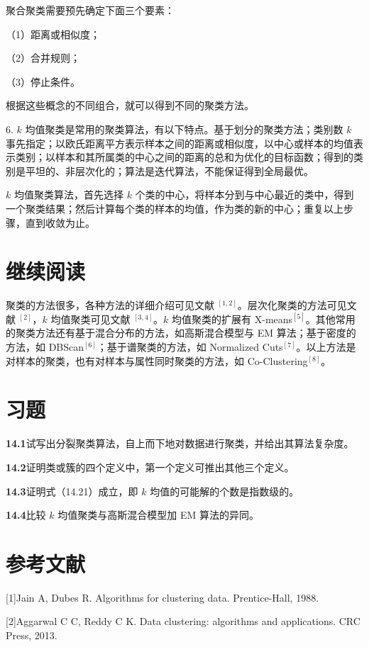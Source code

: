 \documentclass[UTF8,12pt,a4paper,fontset=fandol]{ctexart}
\begin{document}
聚合聚类需要预先确定下面三个要素：

（1）距离或相似度；

（2）合并规则；

（3）停止条件。

根据这些概念的不同组合，就可以得到不同的聚类方法。

6. $k$ 均值聚类是常用的聚类算法，有以下特点。基于划分的聚类方法；类别数 $k$ 事先指定；以欧氏距离平方表示样本之间的距离或相似度，以中心或样本的均值表示类别；以样本和其所属类的中心之间的距离的总和为优化的目标函数；得到的类别是平坦的、非层次化的；算法是迭代算法，不能保证得到全局最优。

$k$ 均值聚类算法，首先选择 $k$ 个类的中心，将样本分到与中心最近的类中，得到一个聚类结果；然后计算每个类的样本的均值，作为类的新的中心；重复以上步骤，直到收敛为止。

\section*{继续阅读}

聚类的方法很多，各种方法的详细介绍可见文献 $^{[1,2]}$。层次化聚类的方法可见文献 $^{[2]}$，$k$ 均值聚类可见文献 $^{[3,4]}$。$k$ 均值聚类的扩展有 X-means$^{[5]}$。其他常用的聚类方法还有基于混合分布的方法，如高斯混合模型与 EM 算法；基于密度的方法，如 DBScan$^{[6]}$；基于谱聚类的方法，如 Normalized Cuts$^{[7]}$。以上方法是对样本的聚类，也有对样本与属性同时聚类的方法，如 Co-Clustering$^{[8]}$。

\section*{习题}

\noindent\textbf{14.1}\quad 试写出分裂聚类算法，自上而下地对数据进行聚类，并给出其算法复杂度。

\noindent\textbf{14.2}\quad 证明类或簇的四个定义中，第一个定义可推出其他三个定义。

\noindent\textbf{14.3}\quad 证明式（14.21）成立，即 $k$ 均值的可能解的个数是指数级的。

\noindent\textbf{14.4}\quad 比较 $k$ 均值聚类与高斯混合模型加 EM 算法的异同。

\section*{参考文献}

[1]\quad Jain A, Dubes R. Algorithms for clustering data. Prentice-Hall, 1988.

[2]\quad Aggarwal C C, Reddy C K. Data clustering: algorithms and applications. CRC Press, 2013.
\end{document}
